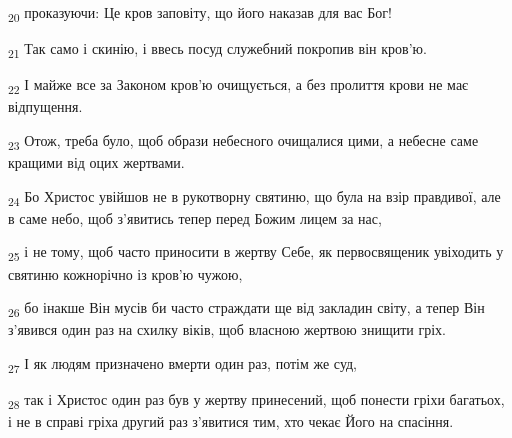 \begin{tcolorbox}
\textsubscript{20} проказуючи: Це кров заповіту, що його наказав для вас Бог!
\end{tcolorbox}
\begin{tcolorbox}
\textsubscript{21} Так само і скинію, і ввесь посуд служебний покропив він кров'ю.
\end{tcolorbox}
\begin{tcolorbox}
\textsubscript{22} І майже все за Законом кров'ю очищується, а без пролиття крови не має відпущення.
\end{tcolorbox}
\begin{tcolorbox}
\textsubscript{23} Отож, треба було, щоб образи небесного очищалися цими, а небесне саме кращими від оцих жертвами.
\end{tcolorbox}
\begin{tcolorbox}
\textsubscript{24} Бо Христос увійшов не в рукотворну святиню, що була на взір правдивої, але в саме небо, щоб з'явитись тепер перед Божим лицем за нас,
\end{tcolorbox}
\begin{tcolorbox}
\textsubscript{25} і не тому, щоб часто приносити в жертву Себе, як первосвященик увіходить у святиню кожнорічно із кров'ю чужою,
\end{tcolorbox}
\begin{tcolorbox}
\textsubscript{26} бо інакше Він мусів би часто страждати ще від закладин світу, а тепер Він з'явився один раз на схилку віків, щоб власною жертвою знищити гріх.
\end{tcolorbox}
\begin{tcolorbox}
\textsubscript{27} І як людям призначено вмерти один раз, потім же суд,
\end{tcolorbox}
\begin{tcolorbox}
\textsubscript{28} так і Христос один раз був у жертву принесений, щоб понести гріхи багатьох, і не в справі гріха другий раз з'явитися тим, хто чекає Його на спасіння.
\end{tcolorbox}
